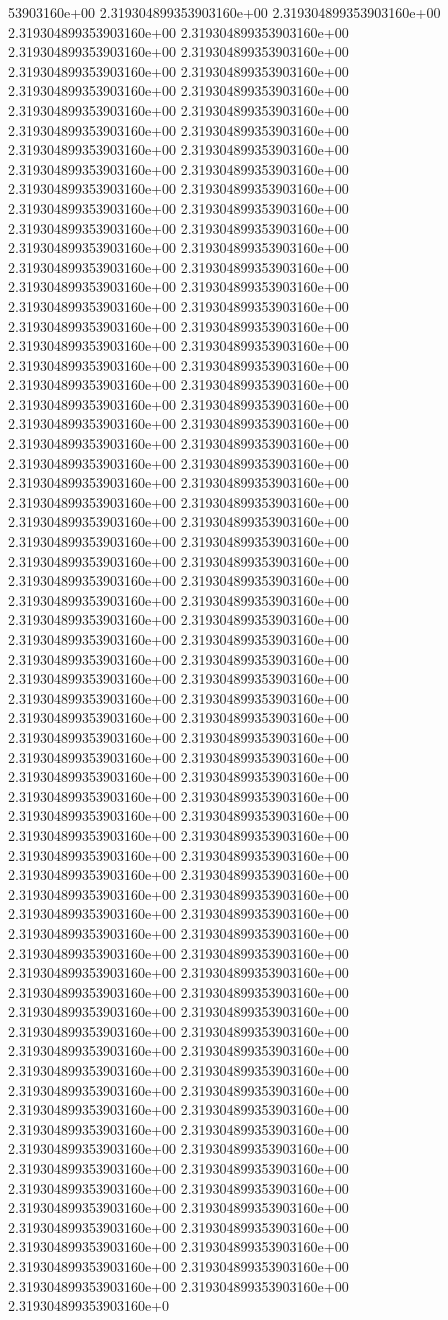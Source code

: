 53903160e+00	2.319304899353903160e+00	2.319304899353903160e+00	2.319304899353903160e+00	2.319304899353903160e+00	2.319304899353903160e+00	2.319304899353903160e+00	2.319304899353903160e+00	2.319304899353903160e+00	2.319304899353903160e+00	2.319304899353903160e+00	2.319304899353903160e+00	2.319304899353903160e+00	2.319304899353903160e+00	2.319304899353903160e+00	2.319304899353903160e+00	2.319304899353903160e+00	2.319304899353903160e+00	2.319304899353903160e+00	2.319304899353903160e+00	2.319304899353903160e+00	2.319304899353903160e+00	2.319304899353903160e+00	2.319304899353903160e+00	2.319304899353903160e+00	2.319304899353903160e+00	2.319304899353903160e+00	2.319304899353903160e+00	2.319304899353903160e+00	2.319304899353903160e+00	2.319304899353903160e+00	2.319304899353903160e+00	2.319304899353903160e+00	2.319304899353903160e+00	2.319304899353903160e+00	2.319304899353903160e+00	2.319304899353903160e+00	2.319304899353903160e+00	2.319304899353903160e+00	2.319304899353903160e+00	2.319304899353903160e+00	2.319304899353903160e+00	2.319304899353903160e+00	2.319304899353903160e+00	2.319304899353903160e+00	2.319304899353903160e+00	2.319304899353903160e+00	2.319304899353903160e+00	2.319304899353903160e+00	2.319304899353903160e+00	2.319304899353903160e+00	2.319304899353903160e+00	2.319304899353903160e+00	2.319304899353903160e+00	2.319304899353903160e+00	2.319304899353903160e+00	2.319304899353903160e+00	2.319304899353903160e+00	2.319304899353903160e+00	2.319304899353903160e+00	2.319304899353903160e+00	2.319304899353903160e+00	2.319304899353903160e+00	2.319304899353903160e+00	2.319304899353903160e+00	2.319304899353903160e+00	2.319304899353903160e+00	2.319304899353903160e+00	2.319304899353903160e+00	2.319304899353903160e+00	2.319304899353903160e+00	2.319304899353903160e+00	2.319304899353903160e+00	2.319304899353903160e+00	2.319304899353903160e+00	2.319304899353903160e+00	2.319304899353903160e+00	2.319304899353903160e+00	2.319304899353903160e+00	2.319304899353903160e+00	2.319304899353903160e+00	2.319304899353903160e+00	2.319304899353903160e+00	2.319304899353903160e+00	2.319304899353903160e+00	2.319304899353903160e+00	2.319304899353903160e+00	2.319304899353903160e+00	2.319304899353903160e+00	2.319304899353903160e+00	2.319304899353903160e+00	2.319304899353903160e+00	2.319304899353903160e+00	2.319304899353903160e+00	2.319304899353903160e+00	2.319304899353903160e+00	2.319304899353903160e+00	2.319304899353903160e+00	2.319304899353903160e+00	2.319304899353903160e+00	2.319304899353903160e+00	2.319304899353903160e+00	2.319304899353903160e+00	2.319304899353903160e+00	2.319304899353903160e+00	2.319304899353903160e+00	2.319304899353903160e+00	2.319304899353903160e+00	2.319304899353903160e+00	2.319304899353903160e+00	2.319304899353903160e+00	2.319304899353903160e+00	2.319304899353903160e+00	2.319304899353903160e+00	2.319304899353903160e+00	2.319304899353903160e+00	2.319304899353903160e+00	2.319304899353903160e+00	2.319304899353903160e+00	2.319304899353903160e+00	2.319304899353903160e+00	2.319304899353903160e+00	2.319304899353903160e+00	2.319304899353903160e+00	2.319304899353903160e+00	2.319304899353903160e+00	2.319304899353903160e+00	2.319304899353903160e+00	2.319304899353903160e+00	2.319304899353903160e+00	2.319304899353903160e+00	2.319304899353903160e+00	2.319304899353903160e+00	2.319304899353903160e+0
